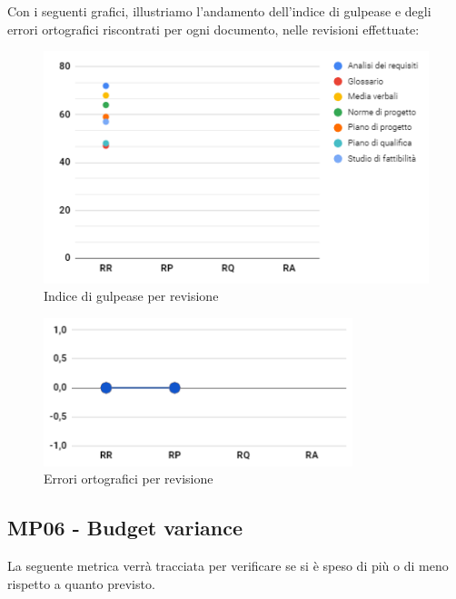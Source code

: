 \noindent Con i seguenti grafici, illustriamo l'andamento dell'indice di gulpease e degli errori ortografici riscontrati per ogni documento, nelle revisioni effettuate:
\begin{figure}[H]
	\centering
	\includegraphics[width=12cm]{images/gulpease.png}
	\caption{Indice di gulpease per revisione}
\end{figure}
\begin{figure}[H]
	\centering
	\includegraphics[width=9cm]{images/err_ortografici.png}
	\caption{Errori ortografici per revisione}
\end{figure}

\subsection{MP06 - Budget variance}
La seguente metrica verrà tracciata per verificare se si è speso di più o di meno rispetto a quanto previsto.


